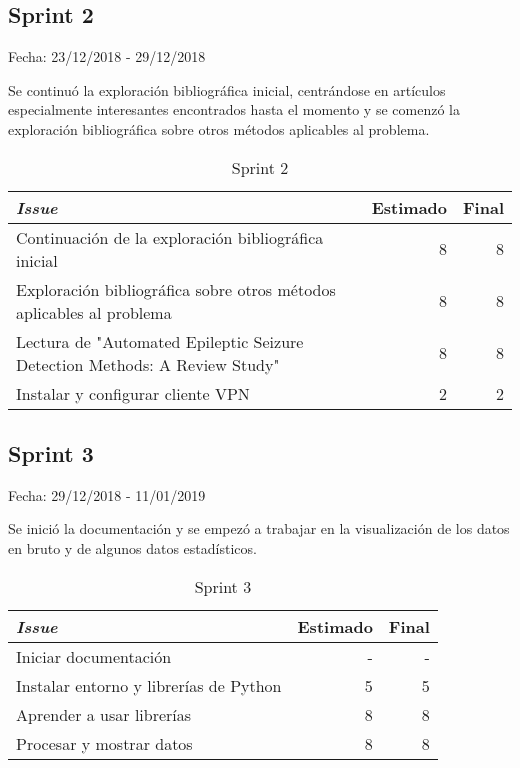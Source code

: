 \subsection{Sprint 2}

Fecha: 23/12/2018 - 29/12/2018

Se continuó la exploración bibliográfica inicial, centrándose en artículos especialmente interesantes encontrados hasta el momento y se comenzó la exploración bibliográfica sobre otros métodos aplicables al problema. 

\begin{table}[H]
	\begin{tabularx}{\textwidth}{Xrr}
		\toprule \textbf{\textit{Issue}} & \textbf{Estimado} & \textbf{Final}\\
		\toprule
		Continuación de la exploración bibliográfica inicial & 8 & 8 \\
		Exploración bibliográfica sobre otros métodos aplicables al problema & 8 & 8 \\
		Lectura de "Automated Epileptic Seizure Detection Methods: A Review Study" & 8 & 8 \\
		Instalar y configurar cliente VPN & 2 & 2 \\
		\bottomrule
	\end{tabularx}
	\caption{Sprint 2}
\end{table}

\subsection{Sprint 3}

Fecha: 29/12/2018 - 11/01/2019

Se inició la documentación y se empezó a trabajar en la visualización de los datos en bruto y de algunos datos estadísticos.

\begin{table}[H]
	\begin{tabularx}{\textwidth}{Xrr}
		\toprule \textbf{\textit{Issue}} & \textbf{Estimado} & \textbf{Final}\\
		\toprule 
		Iniciar documentación & - & - \\
		Instalar entorno y librerías de Python & 5 & 5 \\
		Aprender a usar librerías & 8 & 8 \\
		Procesar y mostrar datos & 8 & 8 \\
		\bottomrule
	\end{tabularx}
	\caption{Sprint 3}
\end{table}

